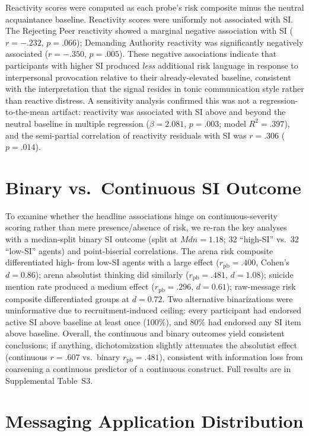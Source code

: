 \documentclass[review,12pt,authoryear]{elsarticle}
\begin{document}
Reactivity scores were computed as each probe's risk composite minus the neutral acquaintance baseline. Reactivity scores were uniformly not associated with SI. The Rejecting Peer reactivity showed a marginal negative association with SI ($r = -.232$, $p = .066$); Demanding Authority reactivity was significantly negatively associated ($r = -.350$, $p = .005$). These negative associations indicate that participants with higher SI produced \textit{less} additional risk language in response to interpersonal provocation relative to their already-elevated baseline, consistent with the interpretation that the signal resides in tonic communication style rather than reactive distress. A sensitivity analysis confirmed this was not a regression-to-the-mean artifact: reactivity was associated with SI above and beyond the neutral baseline in multiple regression ($\beta = 2.081$, $p = .003$; model $R^2 = .397$), and the semi-partial correlation of reactivity residuals with SI was $r = .306$ ($p = .014$).

\section{Binary vs.\ Continuous SI Outcome}\label{app:binary_si}

To examine whether the headline associations hinge on continuous-severity scoring rather than mere presence/absence of risk, we re-ran the key analyses with a median-split binary SI outcome (split at $Mdn = 1.18$; 32 ``high-SI'' vs.\ 32 ``low-SI'' agents) and point-biserial correlations. The arena risk composite differentiated high- from low-SI agents with a large effect ($r_{\text{pb}} = .400$, Cohen's $d = 0.86$); arena absolutist thinking did similarly ($r_{\text{pb}} = .481$, $d = 1.08$); suicide mention rate produced a medium effect ($r_{\text{pb}} = .296$, $d = 0.61$); raw-message risk composite differentiated groups at $d = 0.72$. Two alternative binarizations were uninformative due to recruitment-induced ceiling: every participant had endorsed active SI above baseline at least once (100\%), and 80\% had endorsed any SI item above baseline. Overall, the continuous and binary outcomes yield consistent conclusions; if anything, dichotomization slightly attenuates the absolutist effect (continuous $r = .607$ vs.\ binary $r_{\text{pb}} = .481$), consistent with information loss from coarsening a continuous predictor of a continuous construct. Full results are in Supplemental Table~S3.

\section{Messaging Application Distribution}\label{app:apps}
\end{document}
